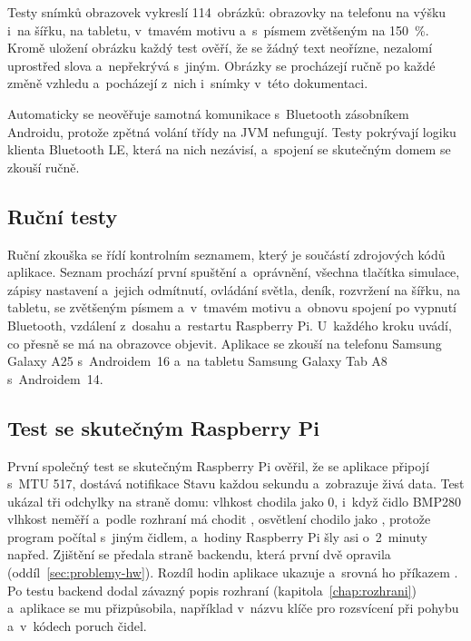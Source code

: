 Testy snímků obrazovek vykreslí 114~obrázků: obrazovky na telefonu na výšku i~na šířku, na
tabletu, v~tmavém motivu a~s~písmem zvětšeným na 150~\%. Kromě uložení obrázku každý test
ověří, že se žádný text neořízne, nezalomí uprostřed slova a~nepřekrývá s~jiným. Obrázky se
procházejí ručně po každé změně vzhledu a~pocházejí z~nich i~snímky v~této dokumentaci.

Automaticky se neověřuje samotná komunikace s~Bluetooth zásobníkem Androidu, protože zpětná
volání třídy  na JVM nefungují. Testy pokrývají logiku klienta Bluetooth LE,
která na nich nezávisí, a~spojení se skutečným domem se zkouší ručně.

\subsection{Ruční testy}

Ruční zkouška se řídí kontrolním seznamem, který je součástí zdrojových kódů aplikace. Seznam
prochází první spuštění a~oprávnění, všechna tlačítka simulace, zápisy nastavení a~jejich
odmítnutí, ovládání světla, deník, rozvržení na šířku, na tabletu, se zvětšeným písmem
a~v~tmavém motivu a~obnovu spojení po vypnutí Bluetooth, vzdálení z~dosahu a~restartu
Raspberry Pi. U~každého kroku uvádí, co přesně se má na obrazovce objevit. Aplikace se zkouší
na telefonu Samsung Galaxy A25 s~Androidem~16 a~na tabletu Samsung Galaxy Tab A8
s~Androidem~14.

\subsection{Test se skutečným Raspberry Pi}

První společný test se skutečným Raspberry Pi ověřil, že se aplikace připojí s~MTU 517,
dostává notifikace Stavu každou sekundu a~zobrazuje živá data. Test ukázal tři odchylky na
straně domu: vlhkost chodila jako 0, i~když čidlo BMP280 vlhkost neměří a~podle rozhraní má
chodit , osvětlení chodilo jako , protože program počítal s~jiným čidlem,
a~hodiny Raspberry Pi šly asi o~2~minuty napřed. Zjištění se předala straně backendu, která
první dvě opravila (oddíl~\ref{sec:problemy-hw}). Rozdíl hodin aplikace ukazuje a~srovná ho
příkazem . Po testu backend dodal závazný popis rozhraní (kapitola~\ref{chap:rozhrani})
a~aplikace se mu přizpůsobila, například v~názvu klíče pro rozsvícení při pohybu a~v~kódech
poruch čidel.
